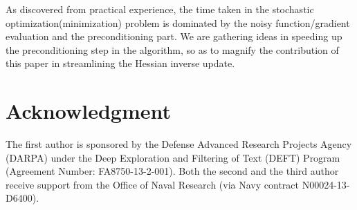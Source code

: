 \documentclass[conference,10.6cpt]{IEEEtran}
\begin{document}
As discovered from practical experience, the time taken in the
stochastic optimization(minimization) problem is dominated by the
noisy function/gradient evaluation and the preconditioning part. We
are gathering ideas in speeding up the preconditioning step in the
algorithm, so as to magnify the contribution of this paper in
streamlining the Hessian inverse update.

\section*{Acknowledgment} The first author is sponsored by the
Defense Advanced Research Projects Agency (DARPA) under the Deep
Exploration and Filtering of Text (DEFT) Program (Agreement Number:
FA8750-13-2-001). Both the second and the third author receive
support from the Office of Naval Research (via Navy contract
N00024-13-D6400).
\end{document}
